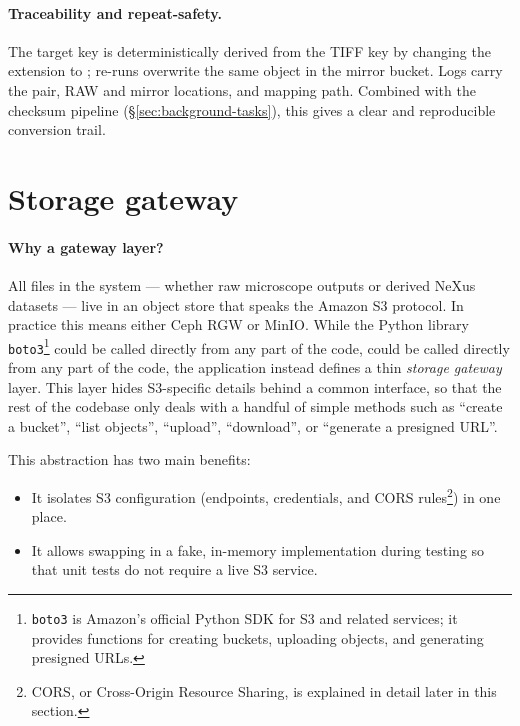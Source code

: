 \paragraph{Traceability and repeat-safety.}
The target key is deterministically derived from the TIFF key by changing the extension to ; re-runs overwrite the same object in the mirror bucket. Logs carry the pair, RAW and mirror locations, and mapping path. Combined with the checksum pipeline (\S\ref{sec:background-tasks}), this gives a clear and reproducible conversion trail.


\section{Storage gateway}\label{sec:storage-gateway}

\paragraph{Why a gateway layer?}
All files in the system --- whether raw microscope outputs or derived NeXus datasets --- live in an object store that speaks the Amazon S3 protocol. 
In practice this means either Ceph RGW or MinIO. 
While the Python library \texttt{boto3}\footnote{%
	\texttt{boto3} is Amazon’s official Python SDK for S3 and related services; 
	it provides functions for creating buckets, uploading objects, and generating presigned URLs.} 
could be called directly from any part of the code, could be called directly from any part of the code, 
the application instead defines a thin \emph{storage gateway} layer. 
This layer hides S3-specific details behind a common interface, 
so that the rest of the codebase only deals with a handful of simple methods 
such as “create a bucket”, “list objects”, “upload”, “download”, 
or “generate a presigned URL”.

This abstraction has two main benefits:  
\begin{itemize}
	\item It isolates S3 configuration (endpoints, credentials, and CORS rules\footnote{%
		CORS, or Cross-Origin Resource Sharing, is explained in detail later in this section.}) in one place.  
	\item It allows swapping in a fake, in-memory implementation during testing 
	so that unit tests do not require a live S3 service.  
\end{itemize}

